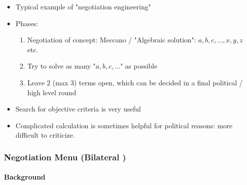 \begin{itemize}
    \item Typical example of "negotiation engineering"
    \item Phases:
        \begin{enumerate}[1.]
            \item Negotiation of concept: Meccano / "Algebraic solution": $a,b,c,\dots,x,y,z$ etc.
            \item Try to solve as many "$a,b,c,\dots$" as possible
            \item Leave $2$ (max $3$) terms open, which can be decided in a final political
                / high level round
        \end{enumerate}
    \item Search for objective criteria is very useful
    \item Complicated calculation is sometimes helpful for political reasons:
        more difficult to criticize.
\end{itemize}


\subsubsection{Negotiation Menu (Bilateral )}

\paragraph{Background}

